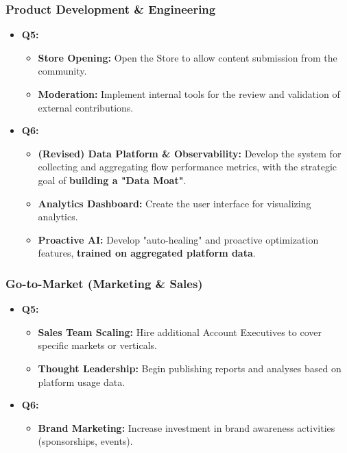 \subsubsection*{Product Development \& Engineering}
\begin{itemize}[leftmargin=*]
    \item \textbf{Q5:}
    \begin{itemize}
        \item \textbf{Store Opening:} Open the Store to allow content submission from the community.
        \item \textbf{Moderation:} Implement internal tools for the review and validation of external contributions.
    \end{itemize}
    \item \textbf{Q6:}
    \begin{itemize}
        \item \textbf{(Revised) Data Platform \& Observability:} Develop the system for collecting and aggregating flow performance metrics, with the strategic goal of \textbf{building a "Data Moat"}.
        \item \textbf{Analytics Dashboard:} Create the user interface for visualizing analytics.
        \item \textbf{Proactive AI:} Develop "auto-healing" and proactive optimization features, \textbf{trained on aggregated platform data}.
    \end{itemize}
\end{itemize}

\subsubsection*{Go-to-Market (Marketing \& Sales)}
\begin{itemize}[leftmargin=*]
    \item \textbf{Q5:}
    \begin{itemize}
        \item \textbf{Sales Team Scaling:} Hire additional Account Executives to cover specific markets or verticals.
        \item \textbf{Thought Leadership:} Begin publishing reports and analyses based on platform usage data.
    \end{itemize}
    \item \textbf{Q6:}
    \begin{itemize}
        \item \textbf{Brand Marketing:} Increase investment in brand awareness activities (sponsorships, events).
    \end{itemize}
\end{itemize}

